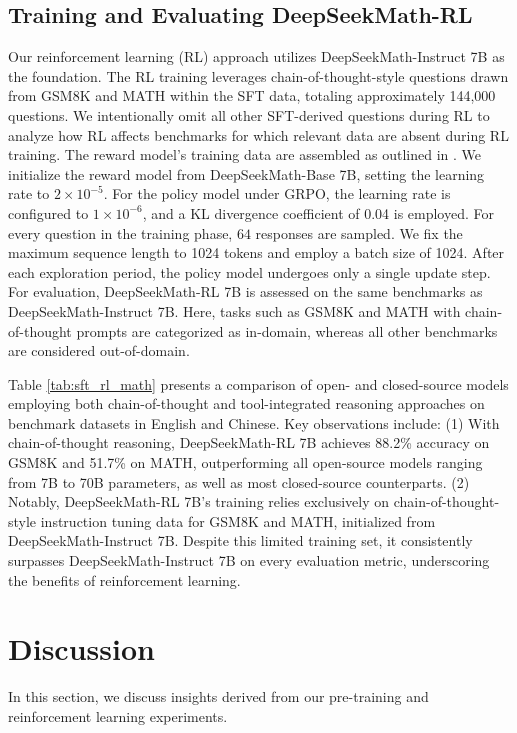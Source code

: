 \begin{itemize}[topsep=0pt]
\subsection{Training and Evaluating DeepSeekMath-RL}

Our reinforcement learning (RL) approach utilizes DeepSeekMath-Instruct 7B as the foundation. The RL training leverages chain-of-thought-style questions drawn from GSM8K and MATH within the SFT data, totaling approximately 144,000 questions. We intentionally omit all other SFT-derived questions during RL to analyze how RL affects benchmarks for which relevant data are absent during RL training. The reward model’s training data are assembled as outlined in \citep{wang2023math}. We initialize the reward model from DeepSeekMath-Base 7B, setting the learning rate to $2 \times 10^{-5}$. For the policy model under GRPO, the learning rate is configured to $1 \times 10^{-6}$, and a KL divergence coefficient of 0.04 is employed. For every question in the training phase, $64$ responses are sampled. We fix the maximum sequence length to 1024 tokens and employ a batch size of 1024. After each exploration period, the policy model undergoes only a single update step. For evaluation, DeepSeekMath-RL 7B is assessed on the same benchmarks as DeepSeekMath-Instruct 7B. Here, tasks such as GSM8K and MATH with chain-of-thought prompts are categorized as in-domain, whereas all other benchmarks are considered out-of-domain.

Table \ref{tab:sft_rl_math} presents a comparison of open- and closed-source models employing both chain-of-thought and tool-integrated reasoning approaches on benchmark datasets in English and Chinese. Key observations include: (1) With chain-of-thought reasoning, DeepSeekMath-RL 7B achieves 88.2\% accuracy on GSM8K and 51.7\% on MATH, outperforming all open-source models ranging from 7B to 70B parameters, as well as most closed-source counterparts. (2) Notably, DeepSeekMath-RL 7B’s training relies exclusively on chain-of-thought-style instruction tuning data for GSM8K and MATH, initialized from DeepSeekMath-Instruct 7B. Despite this limited training set, it consistently surpasses DeepSeekMath-Instruct 7B on every evaluation metric, underscoring the benefits of reinforcement learning.

\section{Discussion}
In this section, we discuss insights derived from our pre-training and reinforcement learning experiments.


\end{itemize}
